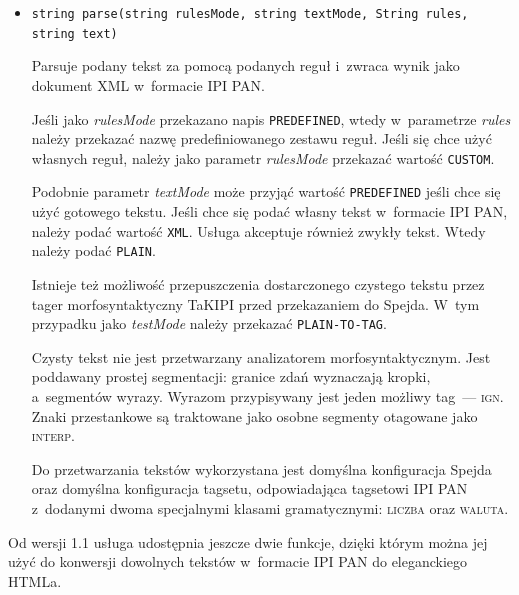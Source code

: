 \documentclass[11pt]{article}
\newcommand{\fn}[1]{\texttt{#1}}
\newcommand{\param}[1]{\textit{#1}}
\newcommand{\tag}[1]{\textsc{#1}}
\begin{document}
\begin{itemize}
  \item \fn{string parse(string rulesMode, string textMode, String rules, string text)}

    Parsuje podany tekst za pomocą podanych reguł i~zwraca wynik
    jako dokument XML w~formacie IPI PAN.

    Jeśli jako \param{rulesMode} przekazano napis \texttt{PREDEFINED},
    wtedy w~parametrze \param{rules} należy przekazać nazwę predefiniowanego
    zestawu reguł. Jeśli się chce użyć własnych reguł, należy jako
    parametr \param{rulesMode} przekazać wartość \texttt{CUSTOM}.

    Podobnie parametr \param{textMode} może przyjąć wartość \texttt{PREDEFINED}
    jeśli chce się użyć gotowego tekstu. Jeśli chce się podać własny tekst
    w~formacie IPI PAN, należy podać wartość \texttt{XML}. Usługa akceptuje
    również zwykły tekst. Wtedy należy podać \texttt{PLAIN}.
    
    Istnieje też możliwość przepuszczenia dostarczonego czystego tekstu przez
    tager morfosyntaktyczny TaKIPI przed przekazaniem do Spejda. W~tym przypadku
    jako \param{testMode} należy przekazać \texttt{PLAIN-TO-TAG}.
    
    Czysty tekst nie jest przetwarzany analizatorem morfosyntaktycznym. Jest
    poddawany prostej segmentacji: granice zdań wyznaczają kropki, a~segmentów
    wyrazy. Wyrazom przypisywany jest jeden możliwy tag~--- \tag{ign}.
    Znaki przestankowe są traktowane jako osobne segmenty otagowane jako
    \tag{interp}.
    
    Do przetwarzania tekstów wykorzystana jest domyślna konfiguracja Spejda oraz
    domyślna konfiguracja tagsetu, odpowiadająca tagsetowi IPI PAN \cite{tagset}
    z~dodanymi dwoma specjalnymi klasami gramatycznymi: \tag{liczba} oraz
    \tag{waluta}.
    

\end{itemize}

\noindent Od wersji 1.1 usługa udostępnia jeszcze dwie funkcje, dzięki którym
można jej użyć do konwersji dowolnych tekstów w~formacie IPI PAN do eleganckiego
HTMLa. 
\end{document}
